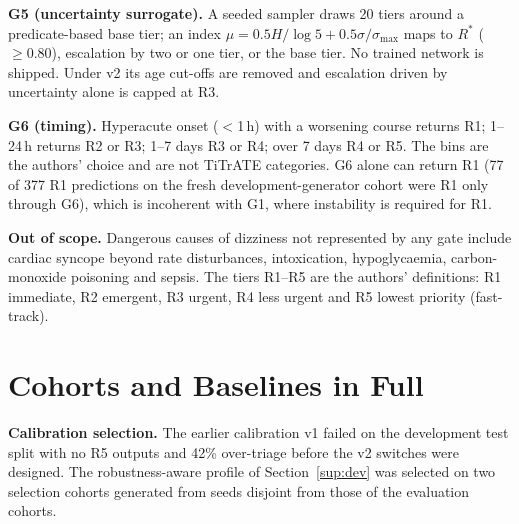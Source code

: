 \documentclass[11pt,a4paper]{article}%
\begin{document}
\textbf{G5 (uncertainty surrogate).} A seeded sampler draws 20 tiers around a predicate-based base tier; an index $\mu=0.5H/\log5+0.5\sigma/\sigma_{\max}$ maps to $R^*$ ($\ge0.80$), escalation by two or one tier, or the base tier. No trained network is shipped. Under v2 its age cut-offs are removed and escalation driven by uncertainty alone is capped at R3.

\textbf{G6 (timing).} Hyperacute onset ($<$1\,h) with a worsening course returns R1; 1--24\,h returns R2 or R3; 1--7 days R3 or R4; over 7 days R4 or R5. The bins are the authors' choice and are not TiTrATE categories. G6 alone can return R1 (77 of 377 R1 predictions on the fresh development-generator cohort were R1 only through G6), which is incoherent with G1, where instability is required for R1.

\textbf{Out of scope.} Dangerous causes of dizziness not represented by any gate include cardiac syncope beyond rate disturbances, intoxication, hypoglycaemia, carbon-monoxide poisoning and sepsis. The tiers R1--R5 are the authors' definitions: R1 immediate, R2 emergent, R3 urgent, R4 less urgent and R5 lowest priority (fast-track).

\section{Cohorts and Baselines in Full}\label{sup:methods}

\textbf{Calibration selection.} The earlier calibration v1 failed on the development test split with no R5 outputs and 42\% over-triage before the v2 switches were designed. The robustness-aware profile of Section~\ref{sup:dev} was selected on two selection cohorts generated from seeds disjoint from those of the evaluation cohorts.
\end{document}
